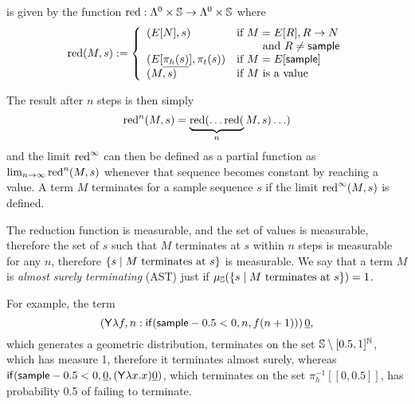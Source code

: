  is given by the function $\operatorname{red} : \Lambda^0 \times {\mathbb{S}} \to \Lambda^0 \times {\mathbb{S}}$ where
\begin{equation*}
\operatorname{red}(M,s) := \left\{
    \begin{array}{ll}
        (E[N],s) & \text{if } M = E[R], R \to N\\
        & \qquad \text{ and } R \neq \mathsf{sample} \\
        (E[\underline{\pi_h(s)}],\pi_t(s)) & \text{if } M = E[\mathsf{sample}] \\
        (M,s) & \text{if } M \text{ is a value}
    \end{array} \right .
\end{equation*}

The result after $n$ steps is then simply 
\[
\operatorname{red}^n(M,s) = \underbrace{\operatorname{red}(\ldots\operatorname{red}(}_n M,s)\ldots)
\] 
and the limit $\operatorname{red}^\infty$ can then be defined as a partial function as $\lim_{n \to \infty} \operatorname{red}^n(M,s)$ whenever that sequence becomes constant by reaching a value. A term $M$ terminates for a sample sequence $s$ if the limit $\operatorname{red}^\infty(M,s)$ is defined.

The reduction function is measurable, and the set of values is measurable, therefore the set of $s$ such that $M$ terminates at $s$ within $n$ steps is measurable for any $n$, therefore $\{s \mid \hbox{$M$ terminates at $s$}\}$ is measurable. 
We say that a term $M$ is \emph{almost surely terminating} (AST) just if $\mu_{{\mathbb{S}}}(\{s \mid \hbox{$M$ terminates at $s$}\}) = 1$.

\iffalse
\lo{Alternatively, define the \emph{runtime of $M$} to be the random variable 
\[
T_M(s) := 
\begin{cases}
\min \set{n \mid \pi_0(\red^n(M, s)) \textrm{ is a value}} & \hbox{if $\red^\infty(M,s)$ is defined}\\
\infty & \hbox{otherwise}
\end{cases}
\]
Equivalently, we say that $M$ is \emph{almost surely terminating} (AST) if $T_M < \infty$ a.s.; 
and $M$ is \emph{positively almost surely terminating} (PAST) if $\expect{T_M} < \infty$.}
\fi
For example, the term 
\[
(\mathsf{Y} \lambda f, n: \mathsf{if}(\mathsf{sample} - 0.5 < 0, n, f (n+1)) ) \, \underline{0},
\] 
which generates a geometric distribution, terminates on the set ${\mathbb{S}} \setminus [0.5,1]^\mathbb N$, which has measure 1, therefore it terminates almost surely, whereas 
\(
\mathsf{if}(\mathsf{sample} - 0.5 < 0, \underline 0, (\mathsf{Y} \lambda x. x) \underline 0)
\), 
which terminates on the set $\pi_h^{-1}[[0,0.5]]$, has probability 0.5 of failing to terminate.

